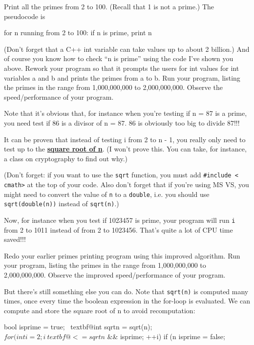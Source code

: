 \begin{console}
\begin{ex} Print all the primes from 2 to 100. (Recall that 1 is
not a prime.) The pseudocode is
\begin{console}
for n running from 2 to 100:
    if n is prime, print n
\end{console}
(Don't forget that a C++ int variable can take values up
to about 2 billion.) And of course you know how to check ``n is prime''
using the code I've shown you above. Rework your program
so that it prompts the users for int values for int variables a and b
and prints the primes from a to b. Run your program, listing the primes
in the range from 1,000,000,000 to 2,000,000,000. Observe the
speed/performance of your program.
\end{ex}
Note that it's obvious that, for instance when
you're testing if n = 87 is a prime, you need
 test if 86 is a divisor of n = 87. 86 is obviously too big
to divide 87!!!

It can be proven that instead of testing i from 2 to n - 1, you really only need to test up to the \underline{\textbf{square root of n}}. (I won't prove this. You can take, for instance, a class on cryptography to find out why.)
(Don't forget: if you want to use the \texttt{sqrt} function, you must add \texttt{\#include < cmath>} at the top of your code. Also don't forget that if you're using MS VS, you might need to convert the value of \texttt{n} to a \texttt{double}, i.e. you should use \texttt{sqrt(double(n))} instead of \texttt{sqrt(n)}.)

Now, for instance when you test if 1023457 is prime, your program will
run \texttt{i} from 2 to 1011 instead of from 2 to 1023456.
That's quite a lot of CPU time saved!!!

\begin{ex}
Redo your earlier primes printing program using this
improved algorithm. Run your program, listing the primes in the range
from 1,000,000,000 to 2,000,000,000. Observe the improved
speed/performance of your program.
\end{ex}
But there's still something else you can do. Note that
\texttt{sqrt(n)} is computed many times, once every time the boolean
expression in the for-loop is evaluated. We can compute and store the
square root of n to avoid recomputation:
\begin{console}[commandchars=\~\@\$]
bool isprime = true;
~textbf@int sqrtn = sqrt(n);$
for (int i = 2; i ~textbf@<= sqrtn$ && isprime; ++i)
{   
    if (n %
    {
        isprime = false;
    }
}


\end{console}
\end{console}
